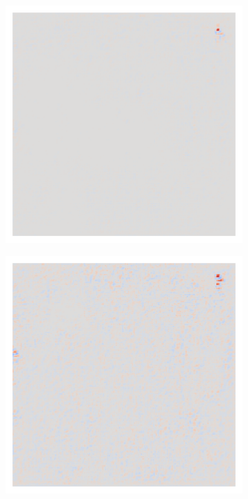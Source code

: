\begin{figure}[H]
    \centering
    \begin{subfigure}{0.19\linewidth}
        \centering
        \includegraphics[height=1\linewidth]{01-images/05-resultate/uap_resnet50/uap0-resnet50-covidx_data-n200-robustificationslevel0.png}
    \end{subfigure}\hfill%
    \begin{subfigure}{0.19\linewidth}
        \centering
        \includegraphics[height=1\linewidth]{01-images/05-resultate/uap_resnet50/uap1-resnet50-covidx_data-n200-robustificationslevel0.png}

\end{subfigure}
\end{figure}
